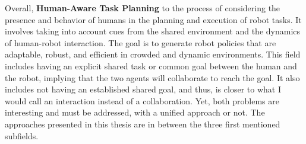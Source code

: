 Overall, \textbf{Human-Aware Task Planning} to the process of considering the presence and behavior of humans in the planning and execution of robot tasks. It involves taking into account cues from the shared environment and the dynamics of human-robot interaction. The goal is to generate robot policies that are adaptable, robust, and efficient in crowded and dynamic environments. This field includes having an explicit shared task or common goal between the human and the robot, implying that the two agents will collaborate to reach the goal. It also includes not having an established shared goal, and thus, is closer to what I would call an interaction instead of a collaboration. Yet, both problems are interesting and must be addressed, with a unified approach or not. 
The approaches presented in this thesis are in between the three first mentioned subfields. 


